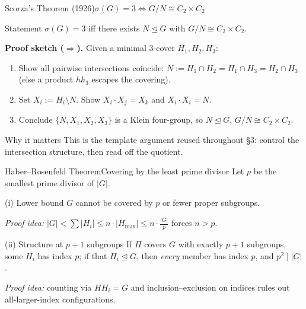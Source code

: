\documentclass[9pt,aspectratio=169]{beamer}
\begin{document}
\begin{frame}{Scorza's Theorem (1926)}{$\sigma(G)=3 \iff G/N \cong C_2\times C_2$}
\begin{block}{Statement}
$\sigma(G) = 3$ \; iff \; there exists $N \trianglelefteq G$ with $G/N \cong C_2\times C_2$.
\end{block}
\textbf{Proof sketch ($\Rightarrow$).} Given a minimal 3-cover $H_1,H_2,H_3$:
\begin{enumerate}
\item Show all pairwise intersections coincide: $N := H_1\cap H_2 = H_1\cap H_3 = H_2\cap H_3$ (else a product $hh_3$ escapes the covering).
\item Set $X_i := H_i\setminus N$. Show $X_i\cdot X_j = X_k$ and $X_i\cdot X_i = N$.
\item Conclude $\{N,X_1,X_2,X_3\}$ is a Klein four-group, so $N\trianglelefteq G$, $G/N\cong C_2\times C_2$.
\end{enumerate}
\vspace{4pt}
\begin{alertblock}{Why it matters}
This is the template argument reused throughout \S3: control the intersection structure, then read off the quotient.
\end{alertblock}
\end{frame}

\begin{frame}{Haber--Rosenfeld Theorem}{Covering by the least prime divisor}
Let $p$ be the smallest prime divisor of $|G|$.
\begin{block}{(i) Lower bound}
$G$ cannot be covered by $p$ or fewer proper subgroups.
\end{block}
\textit{Proof idea:} $|G| < \sum|H_i| \le n\cdot|H_{\max}| \le n\cdot\frac{|G|}{p}$ forces $n > p$.
\begin{block}{(ii) Structure at $p+1$ subgroups}
If $\Pi$ covers $G$ with exactly $p+1$ subgroups, some $H_i$ has index $p$; if that $H_i \trianglelefteq G$, then \emph{every} member has index $p$, and $p^2 \mid |G|$.
\end{block}
\textit{Proof idea:} counting via $HH_i = G$ and inclusion–exclusion on indices rules out all-larger-index configurations.
\end{frame}
\end{document}
